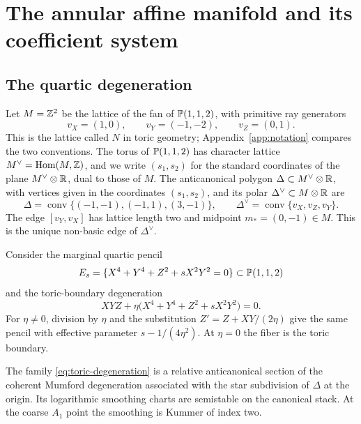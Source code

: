 \section{The annular affine manifold and its coefficient system}
\label{sec:affine-kummer}

\subsection{The quartic degeneration}

Let $M=\mathbb Z^2$ be the lattice of the fan of $\mathbb P(1,1,2)$, with primitive
ray generators
\[
 v_X=(1,0),\qquad v_Y=(-1,-2),\qquad v_Z=(0,1).
\]
This is the lattice called $N$ in toric geometry;
Appendix~\ref{app:notation} compares the two conventions.  The torus of
$\mathbb P(1,1,2)$ has character lattice
$M^\vee=\operatorname{Hom}(M,\mathbb Z)$, and we write $(s_1,s_2)$ for the
standard coordinates of the plane $M^\vee\otimes\mathbb R$, dual to those of $M$.
The anticanonical polygon $\Delta\subset M^\vee\otimes\mathbb R$, with vertices
given in the coordinates $(s_1,s_2)$, and its polar
$\Delta^\vee\subset M\otimes\mathbb R$ are
\begin{equation}\label{eq:polygons}
 \Delta=\operatorname{conv}\{(-1,-1),(-1,1),(3,-1)\},
 \qquad
 \Delta^\vee=\operatorname{conv}\{v_X,v_Z,v_Y\}.
\end{equation}
The edge $[v_Y,v_X]$ has lattice length two and midpoint
$m_*=(0,-1)\in M$.  This is the unique non-basic edge of $\Delta^\vee$.

Consider the marginal quartic pencil
\begin{equation}\label{eq:quartic-pencil}
 E_s=\{X^4+Y^4+Z^2+sX^2Y^2=0\}\subset\mathbb P(1,1,2)
\end{equation}
and the toric-boundary degeneration
\begin{equation}\label{eq:toric-degeneration}
 XYZ+\eta\bigl(X^4+Y^4+Z^2+sX^2Y^2\bigr)=0.
\end{equation}
For $\eta\ne0$, division by $\eta$ and the substitution
$Z'=Z+XY/(2\eta)$ give the same pencil with effective parameter
$s-1/(4\eta^2)$.  At $\eta=0$ the fiber is the toric boundary.

\begin{proposition}\label{prop:coherent-degeneration}
The family \eqref{eq:toric-degeneration} is a relative anticanonical section
of the coherent Mumford degeneration associated with the star subdivision of
$\Delta$ at the origin.  Its logarithmic smoothing charts are semistable on
the canonical stack.  At the coarse $A_1$ point the smoothing is Kummer of
index two.
\end{proposition}

